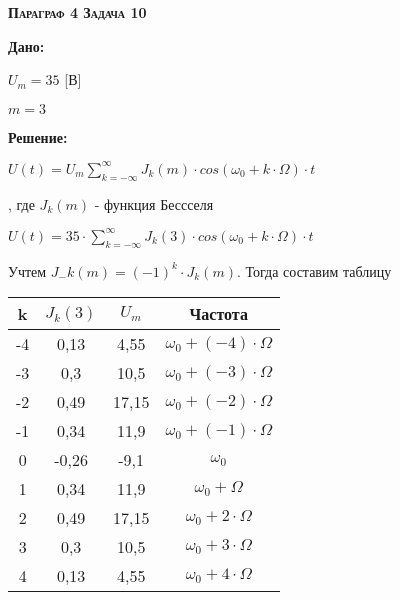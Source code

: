 \documentclass[a4paper, 12pt]{report}
\begin{document}
\textbf{ \textsc{Параграф 4 Задача 10}}

\textbf{Дано:}

$U_m = 35 $ [В]

$m = 3$

\textbf{Решение:}

$U(t) = U_m \displaystyle\sum_{k= - \infty}^{\infty} J_k(m) \cdot cos(\omega_0 + k\cdot\Omega)\cdot t$  

, где $  J_k(m) $ - функция Бессселя

$U(t) = 35 \cdot \displaystyle\sum_{k= - \infty}^{\infty} J_k(3) \cdot cos(\omega_0 + k\cdot\Omega)\cdot t$

Учтем $J_-k(m) = (-1)^k\cdot J_k(m)$. Тогда составим таблицу

\begin{center}
	\begin{tabular}{|c | c | c | c|} 
		\hline
		k & $J_k(3)$ & $U_m$ & Частота \\ [1ex] 
		\hline
		-4 & 0,13 & 4,55 &  $\omega _0 + (-4)\cdot \Omega$ \\ [1ex] 
		\hline
		-3 & 0,3 & 10,5 &  $\omega _0 + (-3)\cdot \Omega$ \\ [1ex] 
		\hline
		-2 & 0,49 & 17,15 & $\omega _0 + (-2)\cdot \Omega$  \\ [1ex] 
		\hline
		-1 & 0,34 & 11,9 &  $\omega _0 + (-1)\cdot \Omega$  \\ [1ex] 
		\hline
		0 & -0,26 & -9,1 & $\omega _0$ \\ [1ex] 
		\hline
		1 & 0,34 & 11,9 & $\omega _0 +  \Omega$ \\ [1ex] 
		\hline
		2 & 0,49 & 17,15 & $\omega _0 + 2\cdot \Omega$ \\ [1ex] 
		\hline
		3 & 0,3 & 10,5 & $\omega _0 + 3\cdot \Omega$ \\ [1ex] 
		\hline
		4 & 0,13 & 4,55 & $\omega _0 + 4\cdot \Omega$ \\ [1ex] 
		\hline
	\end{tabular}
\end{center}
\centering

\end{document}
